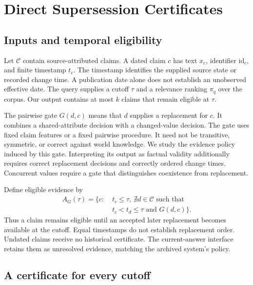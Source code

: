 \section{Direct Supersession Certificates}
\label{sec:method}

\subsection{Inputs and temporal eligibility}

Let $\mathcal C$ contain source-attributed claims.
A dated claim $c$ has text $x_c$, identifier $\mathrm{id}_c$, and finite timestamp $t_c$.
The timestamp identifies the supplied source state or recorded change time.
A publication date alone does not establish an unobserved effective date.
The query supplies a cutoff $\tau$ and a relevance ranking $\pi_q$ over the corpus.
Our output contains at most $k$ claims that remain eligible at $\tau$.

The pairwise gate $G(d,c)$ means that $d$ supplies a replacement for $c$.
It combines a shared-attribute decision with a changed-value decision.
The gate uses fixed claim features or a fixed pairwise procedure.
It need not be transitive, symmetric, or correct against world knowledge.
We study the evidence policy induced by this gate.
Interpreting its output as factual validity additionally requires correct replacement decisions and correctly ordered change times.
Concurrent values require a gate that distinguishes coexistence from replacement.

Define eligible evidence by
\begin{equation}
\begin{split}
A_G(\tau)=\{c:\;&t_c\leq\tau,\ \nexists d\in\mathcal C\text{ such that}\\
&t_c<t_d\leq\tau\text{ and }G(d,c)\}.
\end{split}
\label{eq:eligibility}
\end{equation}
Thus a claim remains eligible until an accepted later replacement becomes available at the cutoff.
Equal timestamps do not establish replacement order.
Undated claims receive no historical certificate.
The current-answer interface retains them as unresolved evidence, matching the archived system's policy.

\subsection{A certificate for every cutoff}

